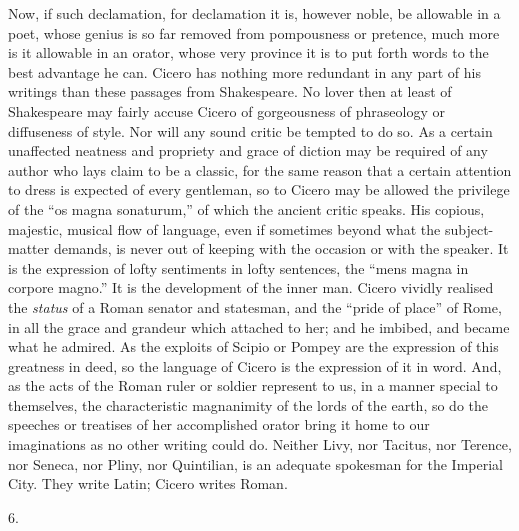 Now, if such declamation, for declamation it is, however noble, be
allowable in a poet, whose genius is so far removed from pompousness
or pretence, much more is it allowable in an orator, whose very
province it is to put forth words to the best advantage he can. Cicero
has nothing more redundant in any part of his writings than these
passages from Shakespeare. No lover then at least of Shakespeare may
fairly accuse Cicero of gorgeousness of phraseology or diffuseness of
style. Nor will any sound critic be tempted to do so. As a certain
unaffected neatness and propriety and grace of diction may be required
of any author who lays claim to be a classic, for the same reason that
a certain attention to dress is expected of every gentleman, so to
Cicero may be allowed the privilege of the ``os magna sonaturum,''
of which the ancient critic speaks. His copious, majestic, musical
flow of language, even if sometimes beyond what the subject-matter
demands, is never out of keeping with the occasion or with the
speaker. It is the expression of lofty sentiments in lofty sentences,
the ``mens magna in corpore magno.'' It is the development of
the inner man. Cicero vividly realised the \emph{status} of a Roman
senator and statesman, and the ``pride of place'' of Rome, in
all the grace and grandeur which attached to her; and he imbibed, and
became what he admired. As the exploits of Scipio or Pompey are
the expression of this greatness in deed, so the language of Cicero is
the expression of it in word. And, as the acts of the Roman ruler or
soldier represent to us, in a manner special to themselves, the
characteristic magnanimity of the lords of the earth, so do the
speeches or treatises of her accomplished orator bring it home to our
imaginations as no other writing could do. Neither Livy, nor Tacitus,
nor Terence, nor Seneca, nor Pliny, nor Quintilian, is an adequate
spokesman for the Imperial City. They write Latin; Cicero writes
Roman.

6.

